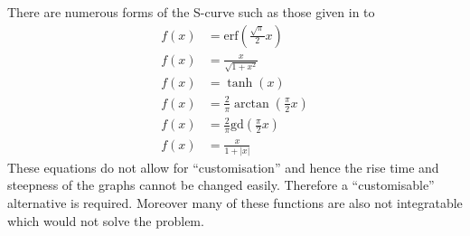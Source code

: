 There are numerous forms of the S-curve such as those given in  to 
\begin{subequations}
	\label{eqn:scurve}
	\begin{align}
		f(x) & = \mathrm{erf} \left ( \frac{\sqrt{\pi}}{2}x \right ) \label{eqn:erf} \\
		f(x) & = \frac{x}{\sqrt{1+x^2}} \label{eqn:sqrt} \\
		f(x) & = \tanh(x) \label{eqn:tanh} \\
		f(x) & = \frac{2}{\pi}\arctan \left ( \frac{\pi}{2}x \right ) \label{eqn:atan} \\
		f(x) & = \frac{2}{\pi}\mathrm{gd} \left ( \frac{\pi}{2}x \right ) \label{eqn:gd} \\
		f(x) & = \frac{x}{1+|x|} \label{eqn:abs}
	\end{align}
\end{subequations}
These equations do not allow for ``customisation'' and hence the rise time and steepness of the graphs cannot be changed easily. Therefore a ``customisable'' alternative is required. Moreover many of these functions are also not integratable which would not solve the problem.

